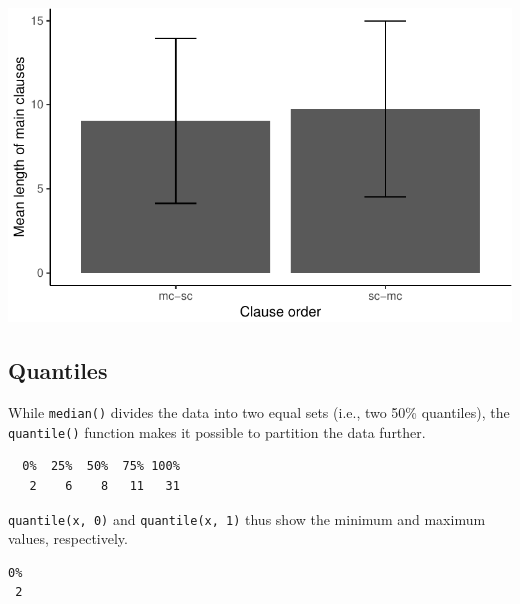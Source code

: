 \documentclass[
  11pt,
  letterpaper,
  DIV=11,
  numbers=noendperiod]{scrreprt}
\newenvironment{Shaded}{\begin{snugshade}}{\end{snugshade}}
\newcommand{\DecValTok}[1]{\textcolor[rgb]{0.68,0.00,0.00}{#1}}
\newcommand{\FunctionTok}[1]{\textcolor[rgb]{0.28,0.35,0.67}{#1}}
\newcommand{\NormalTok}[1]{\textcolor[rgb]{0.00,0.23,0.31}{#1}}
\newcommand{\SpecialCharTok}[1]{\textcolor[rgb]{0.37,0.37,0.37}{#1}}
\begin{document}
\includegraphics{Summary_statistics_files/figure-pdf/unnamed-chunk-19-1.pdf}

\subsection{Quantiles}\label{quantiles}

While \texttt{median()} divides the data into two equal sets (i.e., two
50\% quantiles), the \texttt{quantile()} function makes it possible to
partition the data further.

\begin{Shaded}
\end{Shaded}

\begin{verbatim}
  0%  25%  50%  75% 100% 
   2    6    8   11   31 
\end{verbatim}

\texttt{quantile(x,\ 0)} and \texttt{quantile(x,\ 1)} thus show the
minimum and maximum values, respectively.

\begin{Shaded}
\end{Shaded}

\begin{verbatim}
0% 
 2 
\end{verbatim}
\end{document}
